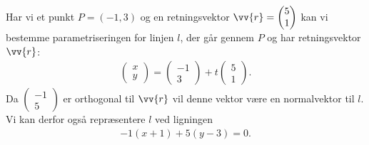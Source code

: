 \begin{exa}
Har vi et punkt $P = (-1,3)$ og en retningsvektor $\vv{r} = \begin{pmatrix}
5 \\ 1
\end{pmatrix}$ kan vi bestemme parametriseringen for linjen $l$, der går gennem $P$ og har retningsvektor $\vv{r}$:
\begin{align*}
\begin{pmatrix}
x \\ y
\end{pmatrix}
= 
\begin{pmatrix}
-1 \\ 3
\end{pmatrix} +  
t
\begin{pmatrix}
5 \\ 1
\end{pmatrix}.
\end{align*}
Da $\begin{pmatrix}
-1 \\ 5
\end{pmatrix}$
er orthogonal til $\vv{r}$ vil denne vektor være en normalvektor til $l$. Vi kan derfor også repræsentere $l$ ved ligningen
\begin{align*}
-1(x+1) + 5(y-3) = 0.
\end{align*}
\end{exa}

